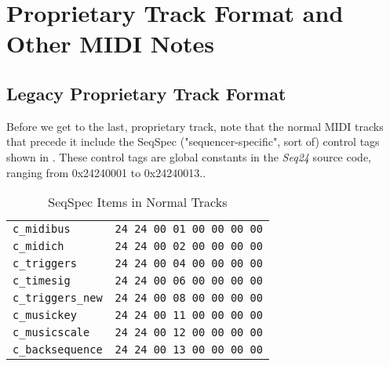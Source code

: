 %
%
%

\section{Proprietary Track Format and Other MIDI Notes}
\label{sec:proprietary_track_and_midi_notes}

\subsection{Legacy Proprietary Track Format}
\label{subsec:legacy_proprietary_track_format}

   Before we get to the last, proprietary track, note that the normal MIDI
   tracks that
   precede it include the SeqSpec ("sequencer-specific", sort of)
   control tags shown in .
   These control tags are global constants in the \textsl{Seq24} source
   code, ranging from 0x24240001 to 0x24240013..

   \begin{table}[htb]
      \centering
      \caption{SeqSpec Items in Normal Tracks}
      \label{table:seqspec_items_normal_tracks}
      \begin{tabular}{l l}
         \texttt{c\_midibus}        & \texttt{24 24 00 01 00 00 00 00} \\
         \texttt{c\_midich}         & \texttt{24 24 00 02 00 00 00 00} \\
         \texttt{c\_triggers}       & \texttt{24 24 00 04 00 00 00 00} \\
         \texttt{c\_timesig}        & \texttt{24 24 00 06 00 00 00 00} \\
         \texttt{c\_triggers\_new}  & \texttt{24 24 00 08 00 00 00 00} \\
         \texttt{c\_musickey}       & \texttt{24 24 00 11 00 00 00 00} \\
         \texttt{c\_musicscale}     & \texttt{24 24 00 12 00 00 00 00} \\
         \texttt{c\_backsequence}   & \texttt{24 24 00 13 00 00 00 00} \\
      \end{tabular}
   \end{table}

